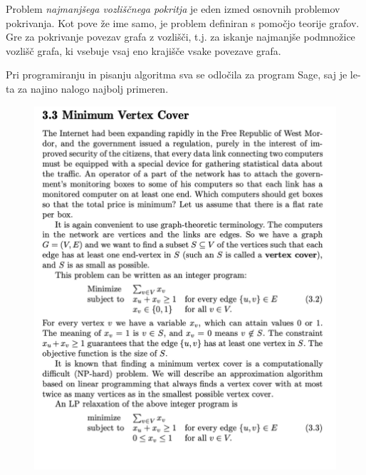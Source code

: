 \documentclass[12pt,a4paper]{amsart}
\theoremstyle{definition} %
\theoremstyle{plain} %
\begin{document}
Problem \textit{najmanjšega vozliščnega pokritja}  je eden izmed osnovnih problemov pokrivanja. Kot pove že ime samo, je problem definiran s pomočjo teorije grafov. Gre za pokrivanje povezav grafa z vozlišči, t.j. za iskanje najmanjše podmnožice vozlišč grafa, ki vsebuje vsaj eno krajišče vsake povezave grafa.

\hspace*{\fill} %

Pri programiranju in pisanju algoritma sva se odločila za program Sage, saj je le-ta za najino nalogo najbolj primeren.

\newpage

\begin{figure}[ht]
\centering
\includegraphics[width=1\textwidth]{Picture1.png}
\end{figure}

\newpage
\end{document}
